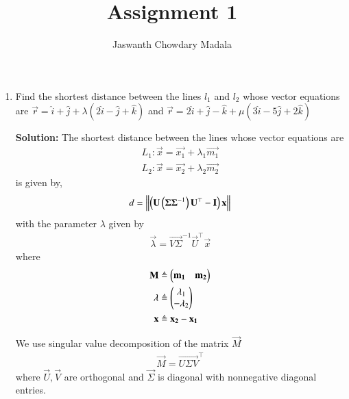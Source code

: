 \documentclass[journal,12pt,twocolumn]{IEEEtran}
\begin{document}
\vspace{3cm}


\title{Assignment 1}
\author{Jaswanth Chowdary Madala}





\maketitle

\newpage


\bigskip

\renewcommand{\thefigure}{\theenumi}
\renewcommand{\thetable}{\theenumi}

\begin{enumerate}
\item Find the shortest distance between the lines $l_1$ and $l_2$ whose vector equations are ${\overrightarrow{r} = \hat{i}+\hat{j}+\lambda(2\hat{i}-\hat{j}+\hat{k})}$ and ${\overrightarrow{r} = 2\hat{i}+\hat{j}-\hat{k}+\mu(3\hat{i}-5\hat{j}+2\hat{k})}$

\textbf{Solution:} 
The shortest distance between the lines whose vector equations are
\begin{align}
L_1: \vec{x} = \vec{x_1} + \lambda_1\vec{m_1} \label{eq:1} \\
L_2: \vec{x} = \vec{x_2} + \lambda_2\vec{m_2} \label{eq:2}
\end{align}
is given by,
\begin{align}
d = \left\lVert\left(\mathbf{U}\left(\mathbf{\Sigma\Sigma}^{-1}\right)\mathbf{U}^\top-\mathbf{I}\right)\mathbf{x}\right\rVert
\end{align}
with the parameter $\lambda$ given by
\begin{align}
\vec{\lambda} = \vec{V\Sigma}^{-1}\vec{U}^\top\vec{x} \label{eq:lambda-sol}
\end{align}
where
\begin{align}
\mathbf{M} &\triangleq \begin{pmatrix}\mathbf{m_1} & \mathbf{m_2}\end{pmatrix} \label{eq:3}\\
\mathbf{\lambda} &\triangleq \begin{pmatrix}\lambda_1\\-\lambda_2\end{pmatrix}\label{eq:4} \\
\mathbf{x} &\triangleq \mathbf{x_2} - \mathbf{x_1} \label{eq:5}
\end{align}

We use singular value decomposition of the matrix $\vec{M}$
\begin{align}
\vec{M} = \vec{U\Sigma V}^\top \label{eq:6}
\end{align}
where $\vec{U}, \vec{V}$ are orthogonal and $\vec{\Sigma}$ is diagonal with nonnegative diagonal entries.


\end{enumerate}
\end{document}
